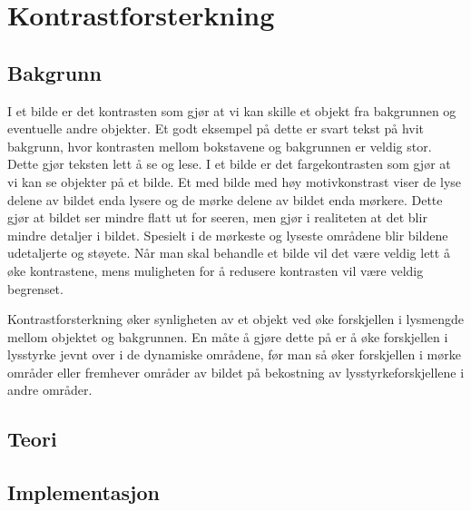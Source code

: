 \section{Kontrastforsterkning}
\label{sec:Kontrastforsterkning}
\subsection{Bakgrunn}
I et bilde er det kontrasten som gjør at vi kan skille et objekt fra bakgrunnen og eventuelle andre objekter.\cite{wiki:kontrast} Et godt eksempel på dette er svart tekst på hvit bakgrunn, hvor kontrasten mellom bokstavene og bakgrunnen er veldig stor. Dette gjør teksten lett å se og lese. I et bilde er det fargekontrasten som gjør at vi kan se objekter på et bilde. Et med bilde med høy motivkonstrast viser de lyse delene av bildet enda lysere og de mørke delene av bildet enda mørkere. Dette gjør at bildet ser mindre flatt ut for seeren, men gjør i realiteten at det blir mindre detaljer i bildet. Spesielt i de mørkeste og lyseste områdene blir bildene udetaljerte og støyete. Når man skal behandle et bilde vil det være veldig lett å øke kontrastene, mens muligheten for å redusere kontrasten vil være veldig begrenset. 

Kontrastforsterkning øker synligheten av et objekt ved øke forskjellen i lysmengde mellom objektet og bakgrunnen. En måte å gjøre dette på er å øke forskjellen i lysstyrke jevnt over i de dynamiske områdene, før man så øker forskjellen i mørke områder eller fremhever områder av bildet på bekostning av lysstyrkeforskjellene i andre områder. 

\subsection{Teori}

\subsection{Implementasjon}
